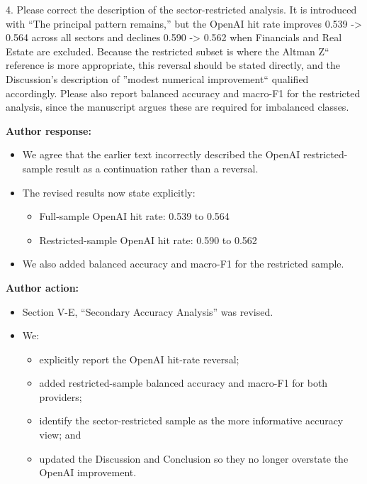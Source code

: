 \documentclass[11pt]{article}
\newcommand{\rvcomment}[1]{{\color{ReviewerGreen}#1}}
\begin{document}
\rvcomment{4. Please correct the description of the sector-restricted analysis. It is introduced with ``The principal pattern remains,'' but the OpenAI hit rate improves 0.539 -> 0.564 across all sectors and declines 0.590 -> 0.562 when Financials and Real Estate are excluded. Because the restricted subset is where the Altman Z`` reference is more appropriate, this reversal should be stated directly, and the Discussion's description of ''modest numerical improvement`` qualified accordingly. Please also report balanced accuracy and macro-F1 for the restricted analysis, since the manuscript argues these are required for imbalanced classes.}

\textbf{Author response:}

\begin{itemize}

\item We agree that the earlier text incorrectly described the OpenAI restricted-sample result as a continuation rather than a reversal.

\item The revised results now state explicitly:

\begin{itemize}

\item Full-sample OpenAI hit rate: 0.539 to 0.564

\item Restricted-sample OpenAI hit rate: 0.590 to 0.562

\end{itemize}

\item We also added balanced accuracy and macro-F1 for the restricted sample.

\end{itemize}

\textbf{Author action:}

\begin{itemize}

\item Section V-E, ``Secondary Accuracy Analysis'' was revised.

\item We:

\begin{itemize}

\item explicitly report the OpenAI hit-rate reversal;

\item added restricted-sample balanced accuracy and macro-F1 for both providers;

\item identify the sector-restricted sample as the more informative accuracy view; and

\item updated the Discussion and Conclusion so they no longer overstate the OpenAI improvement.

\end{itemize}

\end{itemize}
\end{document}
